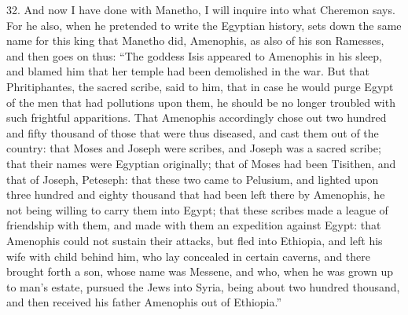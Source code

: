 32. And now I have done with Manetho, I will inquire into what Cheremon
says. For he also, when he pretended to write the Egyptian history, sets
down the same name for this king that Manetho did, Amenophis, as also of
his son Ramesses, and then goes on thus: ``The goddess Isis appeared to
Amenophis in his sleep, and blamed him that her temple had been demolished
in the war. But that Phritiphantes, the sacred scribe, said to him, that
in case he would purge Egypt of the men that had pollutions upon them, he
should be no longer troubled with such frightful apparitions. That
Amenophis accordingly chose out two hundred and fifty thousand of those
that were thus diseased, and cast them out of the country: that Moses and
Joseph were scribes, and Joseph was a sacred scribe; that their names were
Egyptian originally; that of Moses had been Tisithen, and that of Joseph,
Peteseph: that these two came to Pelusium, and lighted upon three hundred
and eighty thousand that had been left there by Amenophis, he not being
willing to carry them into Egypt; that these scribes made a league of
friendship with them, and made with them an expedition against Egypt: that
Amenophis could not sustain their attacks, but fled into Ethiopia, and
left his wife with child behind him, who lay concealed in certain caverns,
and there brought forth a son, whose name was Messene, and who, when he
was grown up to man's estate, pursued the Jews into Syria, being about two
hundred thousand, and then received his father Amenophis out of Ethiopia.''

